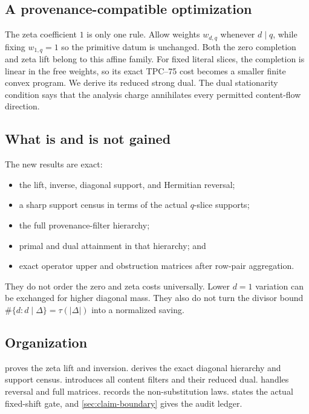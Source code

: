 \subsection{A provenance-compatible optimization}

The zeta coefficient \(1\) is only one rule.  Allow weights
\(w_{d,q}\) whenever \(d\mid q\), while fixing \(w_{1,q}=1\) so the
primitive datum is unchanged.  Both the zero completion and zeta lift
belong to this affine family.  For fixed literal slices, the completion is
linear in the free weights, so its exact TPC--75 cost becomes a smaller
finite convex program.  We derive its reduced strong dual.  The dual
stationarity condition says that the analysis charge annihilates every
permitted content-flow direction.

\subsection{What is and is not gained}

The new results are exact:
\begin{itemize}
 \item the lift, inverse, diagonal support, and Hermitian reversal;
 \item a sharp support census in terms of the actual \(q\)-slice supports;
 \item the full provenance-filter hierarchy;
 \item primal and dual attainment in that hierarchy; and
 \item exact operator upper and obstruction matrices after row-pair
       aggregation.
\end{itemize}
They do not order the zero and zeta costs universally.  Lower
\(d=1\) variation can be exchanged for higher diagonal mass.  They also
do not turn the divisor bound
\(\#\{d:d\mid\Delta\}=\tau(|\Delta|)\) into a normalized saving.

\subsection{Organization}

 proves the zeta lift and inversion.
 derives the exact diagonal hierarchy and
support census.   introduces all content
filters and their reduced dual.  
handles reversal and full matrices.   records
the non-substitution laws.   states the actual
fixed-shift gate, and \cref{sec:claim-boundary} gives the audit ledger.
